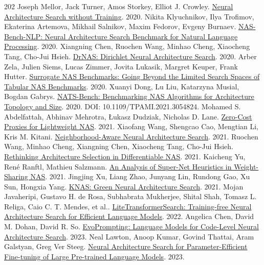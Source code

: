 \begin{thebibliography}{202}
 Joseph Mellor, Jack Turner, Amos Storkey, Elliot J. Crowley. \href{https://arxiv.org/abs/2006.04647}{Neural Architecture Search without Training}. 2020.
 Nikita Klyuchnikov, Ilya Trofimov, Ekaterina Artemova, Mikhail Salnikov, Maxim Fedorov, Evgeny Burnaev. \href{https://arxiv.org/abs/2006.07116v1}{NAS-Bench-NLP: Neural Architecture Search Benchmark for Natural Language Processing}. 2020.
 Xiangning Chen, Ruochen Wang, Minhao Cheng, Xiaocheng Tang, Cho-Jui Hsieh. \href{https://arxiv.org/abs/2006.10355v4}{DrNAS: Dirichlet Neural Architecture Search}. 2020.
 Arber Zela, Julien Siems, Lucas Zimmer, Jovita Lukasik, Margret Keuper, Frank Hutter. \href{https://arxiv.org/abs/2008.09777v4}{Surrogate NAS Benchmarks: Going Beyond the Limited Search Spaces of Tabular NAS Benchmarks}. 2020.
 Xuanyi Dong, Lu Liu, Katarzyna Musial, Bogdan Gabrys. \href{https://arxiv.org/abs/2009.00437v6}{NATS-Bench: Benchmarking NAS Algorithms for Architecture Topology and Size}. 2020. DOI: 10.1109/TPAMI.2021.3054824.
 Mohamed S. Abdelfattah, Abhinav Mehrotra, Łukasz Dudziak, Nicholas D. Lane. \href{https://arxiv.org/abs/2101.08134v2}{Zero-Cost Proxies for Lightweight NAS}. 2021.
 Xiaofang Wang, Shengcao Cao, Mengtian Li, Kris M. Kitani. \href{https://arxiv.org/abs/2105.06369v2}{Neighborhood-Aware Neural Architecture Search}. 2021.
 Ruochen Wang, Minhao Cheng, Xiangning Chen, Xiaocheng Tang, Cho-Jui Hsieh. \href{https://arxiv.org/abs/2108.04392v1}{Rethinking Architecture Selection in Differentiable NAS}. 2021.
 Kaicheng Yu, René Ranftl, Mathieu Salzmann. \href{https://arxiv.org/abs/2110.01154v1}{An Analysis of Super-Net Heuristics in Weight-Sharing NAS}. 2021.
 Jingjing Xu, Liang Zhao, Junyang Lin, Rundong Gao, Xu Sun, Hongxia Yang. \href{https://arxiv.org/abs/2111.13293v1}{KNAS: Green Neural Architecture Search}. 2021.
 Mojan Javaheripi, Gustavo H. de Rosa, Subhabrata Mukherjee, Shital Shah, Tomasz L. Religa, Caio C. T. Mendes, et al.. \href{https://arxiv.org/abs/2203.02094v2}{LiteTransformerSearch: Training-free Neural Architecture Search for Efficient Language Models}. 2022.
 Angelica Chen, David M. Dohan, David R. So. \href{https://arxiv.org/abs/2302.14838v3}{EvoPrompting: Language Models for Code-Level Neural Architecture Search}. 2023.
 Neal Lawton, Anoop Kumar, Govind Thattai, Aram Galstyan, Greg Ver Steeg. \href{https://arxiv.org/abs/2305.16597v1}{Neural Architecture Search for Parameter-Efficient Fine-tuning of Large Pre-trained Language Models}. 2023.

\end{thebibliography}
